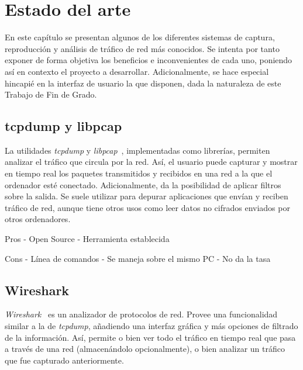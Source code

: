 \chapter{Estado del arte\label{cap:estadoDelArte}}

En este capítulo se presentan algunos de los diferentes sistemas de captura, reproducción y análisis de tráfico de red más conocidos.
Se intenta por tanto exponer de forma objetiva los beneficios e inconvenientes de cada uno, poniendo así en contexto el proyecto a desarrollar.
Adicionalmente, se hace especial hincapié en la interfaz de usuario la que disponen, dada la naturaleza de este Trabajo de Fin de Grado.

\section{tcpdump y libpcap\label{sec:eda:tcpdump}}

La utilidades \textit{tcpdump} y \textit{libpcap}~\cite{tcpdump}, implementadas como librerías, permiten analizar el tráfico que circula por la red.
Así, el usuario puede capturar y mostrar en tiempo real los paquetes transmitidos y recibidos en una red a la que el ordenador esté conectado.
Adicionalmente, da la posibilidad de aplicar filtros sobre la salida.
Se suele utilizar para depurar aplicaciones que envían y reciben tráfico de red, aunque tiene otros usos como leer datos no cifrados enviados por otros ordenadores.

Pros
- Open Source
- Herramienta establecida

Cons
- Línea de comandos
- Se maneja sobre el mismo PC
- No da la tasa

\section{Wireshark\label{sec:eda:wireshark}}

\textit{Wireshark}~\cite{wireshark} es un analizador de protocolos de red.
Provee una funcionalidad similar a la de \textit{tcpdump}, añadiendo una interfaz gráfica y más opciones de filtrado de la información.
Así, permite o bien ver todo el tráfico en tiempo real que pasa a través de una red (almacenándolo opcionalmente), o bien analizar un tráfico que fue capturado anteriormente.

